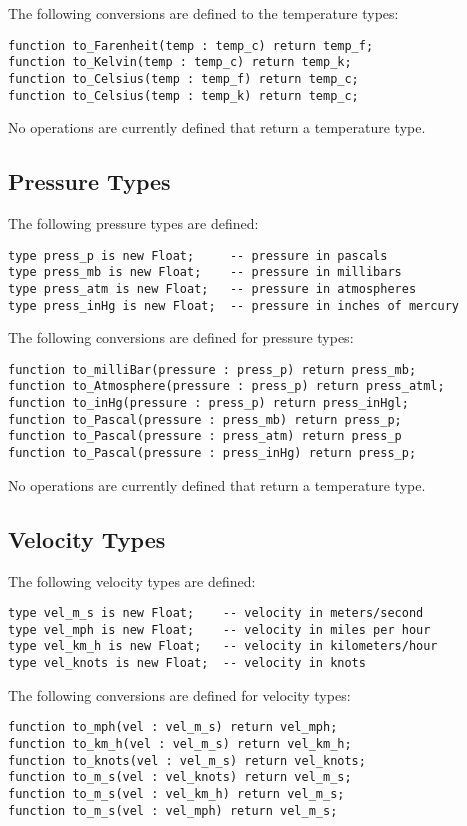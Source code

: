\documentclass[10pt, openany]{book}
\begin{document}
The following conversions are defined to the temperature types:
\begin{lstlisting}
function to_Farenheit(temp : temp_c) return temp_f;
function to_Kelvin(temp : temp_c) return temp_k;
function to_Celsius(temp : temp_f) return temp_c;
function to_Celsius(temp : temp_k) return temp_c;
\end{lstlisting}

No operations are currently defined that return a temperature type.

\subsection{Pressure Types}
The following pressure types are defined:
\begin{lstlisting}
type press_p is new Float;     -- pressure in pascals
type press_mb is new Float;    -- pressure in millibars
type press_atm is new Float;   -- pressure in atmospheres
type press_inHg is new Float;  -- pressure in inches of mercury
\end{lstlisting}

The following conversions are defined for pressure types:
\begin{lstlisting}
function to_milliBar(pressure : press_p) return press_mb;
function to_Atmosphere(pressure : press_p) return press_atml;
function to_inHg(pressure : press_p) return press_inHgl;
function to_Pascal(pressure : press_mb) return press_p;
function to_Pascal(pressure : press_atm) return press_p
function to_Pascal(pressure : press_inHg) return press_p;
\end{lstlisting}

No operations are currently defined that return a temperature type.

\subsection{Velocity Types}
The following velocity types are defined:
\begin{lstlisting}
type vel_m_s is new Float;    -- velocity in meters/second
type vel_mph is new Float;    -- velocity in miles per hour
type vel_km_h is new Float;   -- velocity in kilometers/hour
type vel_knots is new Float;  -- velocity in knots
\end{lstlisting}

The following conversions are defined for velocity types:
\begin{lstlisting}
function to_mph(vel : vel_m_s) return vel_mph;
function to_km_h(vel : vel_m_s) return vel_km_h;
function to_knots(vel : vel_m_s) return vel_knots;
function to_m_s(vel : vel_knots) return vel_m_s;
function to_m_s(vel : vel_km_h) return vel_m_s;
function to_m_s(vel : vel_mph) return vel_m_s;
\end{lstlisting}
\end{document}
